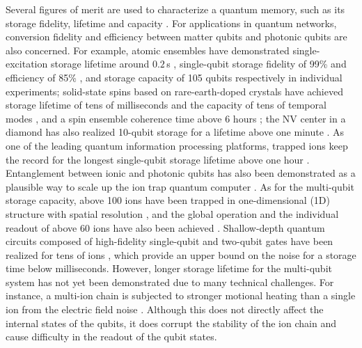 \documentclass[aps,prl,reprint,superscriptaddress,twocolumn,longbibliography]{revtex4-1}
\begin{document}
Several figures of merit are used to characterize a quantum memory, such as its storage fidelity, lifetime and capacity \cite{lvovsky2009optical}. For applications in quantum networks, conversion fidelity and efficiency between matter qubits and photonic qubits are also concerned. For example, atomic ensembles have demonstrated single-excitation storage lifetime around $0.2\,$s \cite{yang2016efficient}, single-qubit storage fidelity of 99\% and efficiency of 85\% \cite{wang2019efficient}, and storage capacity of 105 qubits \cite{jiang2019experimental} respectively in individual experiments; solid-state spins based on rare-earth-doped crystals have achieved storage lifetime of tens of milliseconds \cite{ortu2022storage} and the capacity of tens of temporal modes \cite{lago2021telecom}, and a spin ensemble coherence time above 6 hours \cite{zhong2015optically}; the NV center in a diamond has also realized 10-qubit storage for a lifetime above one minute \cite{PhysRevX.9.031045}. As one of the leading quantum information processing platforms, trapped ions keep the record for the longest single-qubit storage lifetime above one hour \cite{wang2021single}. Entanglement between ionic and photonic qubits has also been demonstrated \cite{blinov2004observation,stute2012tunable,hucul2015modular,bock2018high,krutyanskiy2019light} as a plausible way to scale up the ion trap quantum computer \cite{10.5555/2011617.2011618,duan2010colloquium,hucul2015modular}. As for the multi-qubit storage capacity, above 100 ions have been trapped in one-dimensional (1D) structure with spatial resolution \cite{Pagano_2018}, and the global operation and the individual readout of above 60 ions have also been achieved \cite{2208.03060}. Shallow-depth quantum circuits composed of high-fidelity single-qubit and two-qubit gates have been realized for tens of ions \cite{egan2021fault,postler2022demonstration,2208.01863}, which provide an upper bound on the noise for a storage time below milliseconds. However, longer storage lifetime for the multi-qubit system has not yet been demonstrated due to many technical challenges. For instance, a multi-ion chain is subjected to stronger motional heating than a single ion from the electric field noise \cite{wineland1998experimental,doi:10.1063/1.5088164}. Although this does not directly affect the internal states of the qubits, it does corrupt the stability of the ion chain and cause difficulty in the readout of the qubit states.
\end{document}
